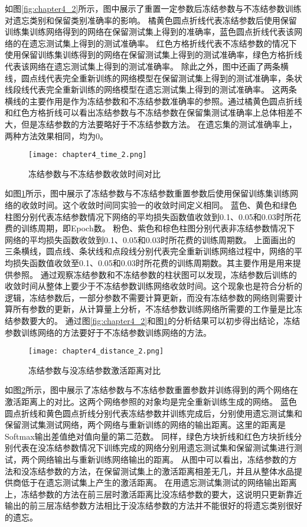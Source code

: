 如图\ref{fig:chapter4_2}所示，图中展示了重置一定参数后冻结参数与不冻结参数训练对遗忘类别和保留类别准确率的影响。
橘黄色圆点折线代表冻结参数后使用保留训练集训练网络得到的网络在保留测试集上得到的准确率，蓝色圆点折线代表该网络的在遗忘测试集上得到的测试准确率。
红色方格折线代表不冻结参数的情况下使用保留训练集训练得到的网络在保留测试集上得到的测试准确率，绿色方格折线代表该网络在遗忘测试集上得到的测试准确率。
除此之外，图中还画了两条横线，圆点线代表完全重新训练的网络模型在保留测试集上得到的测试准确率，条状线段线代表完全重新训练的网络模型在遗忘测试集上得到的测试准确率。
这两条横线的主要作用是作为冻结参数和不冻结参数准确率的参照。通过橘黄色圆点折线和红色方格折线可以看出冻结参数与不冻结参数在保留集测试准确率上总体相差不大，但是冻结参数的方法要略好于不冻结参数方法。
在遗忘集的测试准确率上，两种方法效果相同，均为0。
\begin{figure}
    \centering
    \texttt{[image: chapter4\_time\_2.png]}
    \caption{冻结参数与不冻结参数收敛时间对比}
    \label{fig:chapter4_time_2}
\end{figure}

如图\ref{fig:chapter4_time_2}所示，图中展示了冻结参数与不冻结参数重置参数后使用保留训练集训练网络的收敛时间。这个收敛时间同实验一的收敛时间定义相同。
蓝色、黄色和绿色柱图分别代表冻结参数情况下网络的平均损失函数值收敛到0.1、0.05和0.03时所花费的训练周期，即Epoch数。
粉色、紫色和棕色柱图分别代表非冻结参数情况下网络的平均损失函数收敛到0.1、0.05和0.03时所花费的训练周期数。
上面画出的三条横线，圆点线、条状线和点段线分别代表完全重新训练网络过程中，网络的平均损失函数值收敛至0.1、0.05和0.03时所花费的训练周期数。其主要作用是用来提供参照。
通过观察冻结参数和不冻结参数的柱状图可以发现，冻结参数后训练的收敛时间从整体上要少于不冻结参数训练网络收敛时间。这个现象也是符合分析的逻辑，冻结参数后，一部分参数不需要计算更新，而没有冻结参数的网络则需要计算所有参数的更新，从计算量上分析，不冻结参数训练网络所需要的工作量是比冻结参数要大的。
通过图\ref{fig:chapter4_2}和图\ref{fig:chapter4_time_2}的分析结果可以初步得出结论，冻结参数训练网络的方法要好于不冻结参数训练网络的方法。
\begin{figure}
    \centering
    \texttt{[image: chapter4\_distance\_2.png]}
    \caption{冻结参数与没冻结参数激活距离对比}
    \label{fig:chapter4_distance_2}
\end{figure}

如图\ref{fig:chapter4_distance_2}所示，图中展示了冻结参数与不冻结参数重置参数并训练得到的两个网络在激活距离上的对比。这两个网络参照的对象均是完全重新训练生成的网络。
蓝色圆点折线和黄色圆点折线分别代表冻结参数并训练完成后，分别使用遗忘测试集和保留测试集测试网络，两个网络与重新训练的网络的输出距离。这里的距离是Softmax输出差值绝对值向量的第二范数。
同样，绿色方块折线和红色方块折线分别代表在没冻结参数情况下训练完成的网络分别用遗忘测试集和保留测试集进行测试，两个网络输出与重新训练网络输出的距离。
从图中可以看出，冻结参数的方法和没冻结参数的方法，在保留测试集上的激活距离相差无几，并且从整体水品提供商低于在遗忘测试集上产生的激活距离。
在用遗忘测试集测试的网络输出距离上，冻结参数的方法在前三层时激活距离比没冻结参数的要大，这说明只更新靠近输出的前三层冻结参数方法相比于没冻结参数的方法并不能很好的将遗忘类别很好的遗忘。

